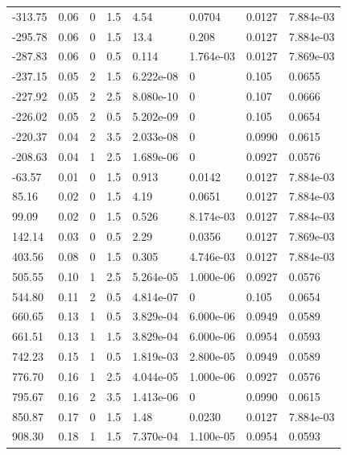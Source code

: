 \documentclass[preview]{standalone}
\begin{document}
{{\begin{tabular}{L{1.2cm}C{1.2cm} C{0.3cm}C{0.5cm} C{1.4cm}C{1.4cm} C{1.4cm}C{1.4cm}}
  -313.75  &  0.06  & 0     & 1.5 &  4.54  & 0.0704  & 0.0127 &  7.884e-03   \\ 
  -295.78  &  0.06  & 0     & 1.5 &  13.4  & 0.208  & 0.0127 &  7.884e-03   \\ 
  -287.83  &  0.06  & 0     & 0.5 &  0.114  & 1.764e-03  & 0.0127 &  7.869e-03   \\ 
  -237.15  &  0.05  & 2     & 1.5 &  6.222e-08  & 0  & 0.105 &  0.0655   \\ 
  -227.92  &  0.05  & 2     & 2.5 &  8.080e-10  & 0  & 0.107 &  0.0666   \\ 
  -226.02  &  0.05  & 2     & 0.5 &  5.202e-09  & 0  & 0.105 &  0.0654   \\ 
  -220.37  &  0.04  & 2     & 3.5 &  2.033e-08  & 0  & 0.0990 &  0.0615   \\ 
  -208.63  &  0.04  & 1     & 2.5 &  1.689e-06  & 0  & 0.0927 &  0.0576   \\ 
  -63.57  &  0.01  & 0     & 1.5 &  0.913  & 0.0142  & 0.0127 &  7.884e-03   \\ 
  85.16  &  0.02  & 0     & 1.5 &  4.19  & 0.0651  & 0.0127 &  7.884e-03   \\ 
  99.09  &  0.02  & 0     & 1.5 &  0.526  & 8.174e-03  & 0.0127 &  7.884e-03   \\ 
  142.14  &  0.03  & 0     & 0.5 &  2.29  & 0.0356  & 0.0127 &  7.869e-03   \\ 
  403.56  &  0.08  & 0     & 1.5 &  0.305  & 4.746e-03  & 0.0127 &  7.884e-03   \\ 
  505.55  &  0.10  & 1     & 2.5 &  5.264e-05  & 1.000e-06  & 0.0927 &  0.0576   \\ 
  544.80  &  0.11  & 2     & 0.5 &  4.814e-07  & 0  & 0.105 &  0.0654   \\ 
  660.65  &  0.13  & 1     & 0.5 &  3.829e-04  & 6.000e-06  & 0.0949 &  0.0589   \\ 
  661.51  &  0.13  & 1     & 1.5 &  3.829e-04  & 6.000e-06  & 0.0954 &  0.0593   \\ 
  742.23  &  0.15  & 1     & 0.5 &  1.819e-03  & 2.800e-05  & 0.0949 &  0.0589   \\ 
  776.70  &  0.16  & 1     & 2.5 &  4.044e-05  & 1.000e-06  & 0.0927 &  0.0576   \\ 
  795.67  &  0.16  & 2     & 3.5 &  1.413e-06  & 0  & 0.0990 &  0.0615   \\ 
  850.87  &  0.17  & 0     & 1.5 &  1.48  & 0.0230  & 0.0127 &  7.884e-03   \\ 
  908.30  &  0.18  & 1     & 1.5 &  7.370e-04  & 1.100e-05  & 0.0954 &  0.0593   \\ 

\end{tabular}}}
\end{document}
